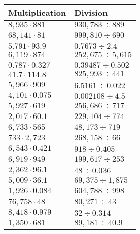 \begin{longtable}[]{@{}ll@{}}
\toprule
Multiplication & Division\tabularnewline
\midrule
\endhead
\(8,935\cdot881\) & \(930,783÷889\)\tabularnewline
\(68,141\cdot81\) & \(999,810÷690\)\tabularnewline
\(5.791\cdot93.9\) & \(0.7673÷2.4\)\tabularnewline
\(6,119\cdot874\) & \(252,675÷5,615\)\tabularnewline
\(0.787\cdot0.327\) & \(0.39487÷0.502\)\tabularnewline
\(41.7\cdot114.8\) & \(825,993÷441\)\tabularnewline
\(5,966\cdot909\) & \(6.5161÷0.022\)\tabularnewline
\(4,101\cdot0.075\) & \(0.002108÷4.5\)\tabularnewline
\(5,927\cdot619\) & \(256,686÷717\)\tabularnewline
\(2,017\cdot60.1\) & \(229,104÷774\)\tabularnewline
\(6,733\cdot565\) & \(48,173÷719\)\tabularnewline
\(733\cdot2,723\) & \(268,158÷66\)\tabularnewline
\(6,543\cdot0.421\) & \(918÷0.405\)\tabularnewline
\(6,919\cdot949\) & \(199,617÷253\)\tabularnewline
\(2,362\cdot96.1\) & \(48÷0.036\)\tabularnewline
\(5,009\cdot36.1\) & \(69,375÷1,875\)\tabularnewline
\(1,926\cdot0.084\) & \(604,788÷998\)\tabularnewline
\(76,758\cdot48\) & \(80,271÷43\)\tabularnewline
\(8,418\cdot0.979\) & \(32÷0.314\)\tabularnewline
\(1,350\cdot681\) & \(89,181÷40.9\)\tabularnewline
\bottomrule
\end{longtable}
